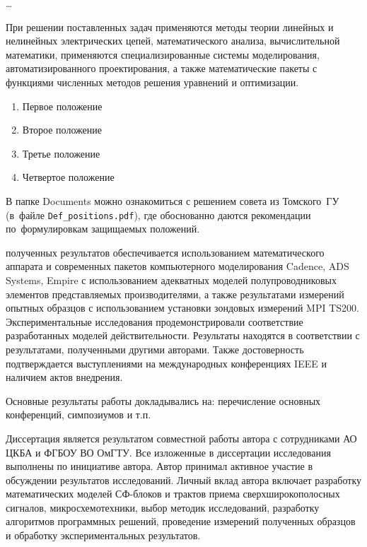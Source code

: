 {\influence} \ldots

{\methods}
При решении поставленных задач применяются методы теории линейных и нелинейных электрических цепей, математического анализа, вычислительной математики, применяются специализированные системы моделирования, автоматизированного проектирования, а также математические пакеты с функциями численных методов решения уравнений и оптимизации.

{}
\begin{enumerate}[beginpenalty=10000] %
  \item Первое положение
  \item Второе положение
  \item Третье положение
  \item Четвертое положение
\end{enumerate}
В папке Documents можно ознакомиться с решением совета из Томского~ГУ
(в~файле \verb+Def_positions.pdf+), где обоснованно даются рекомендации
по~формулировкам защищаемых положений.

{\reliability} полученных результатов обеспечивается использованием математического аппарата и современных пакетов компьютерного моделирования Cadence, ADS Systems, Empire с использованием адекватных моделей полупроводниковых элементов представляемых производителями, а также результатами измерений опытных образцов с использованием установки зондовых измерений MPI TS200. Экспериментальные исследования продемонстрировали соответствие разработанных моделей действительности. Результаты находятся в соответствии с результатами, полученными другими авторами. Также достоверность подтверждается выступлениями на международных конференциях IEEE и наличием актов внедрения.

{\probation}
Основные результаты работы докладывались на:
перечисление основных конференций, симпозиумов и т.\:п.

{\contribution} Диссертация является результатом совместной работы автора с сотрудниками АО ЦКБА и ФГБОУ ВО ОмГТУ. Все изложенные в диссертации исследования выполнены по инициативе автора. Автор принимал активное участие в обсуждении результатов исследований. Личный вклад автора включает разработку математических моделей СФ-блоков и трактов приема сверхширокополосных сигналов, микросхемотехники, выбор методик исследований, разработку алгоритмов программных решений, проведение измерений полученных образцов и обработку экспериментальных результатов.


